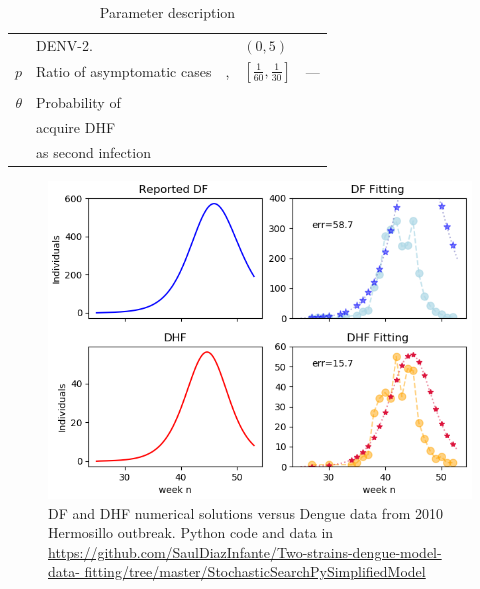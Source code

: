 \begin{table}[htb]
\begin{tabular}{rl m{1.9cm} ll}
		\\
			& \ac{DENV-2}.
			& \cite{Feng1997a}
			& $(0,5)$
      \\
            $p$
            &
            Ratio of asymptomatic cases
            &
            \cite{balmaseda2006high},
            &
            $[\frac{1}{60}, \frac{1}{30}]$
            & ---
            \\
            & &
            \cite{Chastel2011, Chastel2012a}
            \\
			$\theta$
			& Probability of
			\\
			& acquire DHF
			\\
			& as second infection
			\\
			\bottomrule
		\end{tabular}
	\caption{Parameter description}
	\label{tbl:parameter_description}
\end{table}

%
\begin{figure}
	\centering
	\includegraphics[width=\textwidth, keepaspectratio]{fitting_DF_DHF.png}
	\caption{DF and DHF numerical solutions versus
		Dengue data from 2010 Hermosillo outbreak. Python code and
    data in
    \href{github}{https://github.com/SaulDiazInfante/Two-strains-dengue-model-data-%
        fitting/tree/master/StochasticSearchPySimplifiedModel}
	}\label{fig:fitting}
\end{figure}

